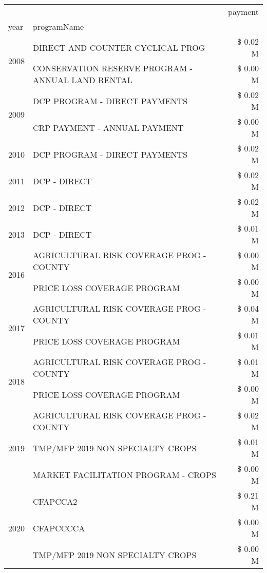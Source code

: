 \begin{tabular}{llr}
\toprule
 &  & payment \\
year & programName &  \\
\midrule
\multirow[t]{2}{*}{2008} & DIRECT AND COUNTER CYCLICAL PROG & \$ 0.02 M \\
 & CONSERVATION RESERVE PROGRAM - ANNUAL LAND RENTAL & \$ 0.00 M \\
\cline{1-3}
\multirow[t]{2}{*}{2009} & DCP PROGRAM - DIRECT PAYMENTS & \$ 0.02 M \\
 & CRP PAYMENT - ANNUAL PAYMENT & \$ 0.00 M \\
\cline{1-3}
2010 & DCP PROGRAM - DIRECT PAYMENTS & \$ 0.02 M \\
\cline{1-3}
2011 & DCP - DIRECT & \$ 0.02 M \\
\cline{1-3}
2012 & DCP - DIRECT & \$ 0.02 M \\
\cline{1-3}
2013 & DCP - DIRECT & \$ 0.01 M \\
\cline{1-3}
\multirow[t]{2}{*}{2016} & AGRICULTURAL RISK COVERAGE PROG - COUNTY & \$ 0.00 M \\
 & PRICE LOSS COVERAGE PROGRAM & \$ 0.00 M \\
\cline{1-3}
\multirow[t]{2}{*}{2017} & AGRICULTURAL RISK COVERAGE PROG - COUNTY & \$ 0.04 M \\
 & PRICE LOSS COVERAGE PROGRAM & \$ 0.01 M \\
\cline{1-3}
\multirow[t]{2}{*}{2018} & AGRICULTURAL RISK COVERAGE PROG - COUNTY & \$ 0.01 M \\
 & PRICE LOSS COVERAGE PROGRAM & \$ 0.00 M \\
\cline{1-3}
\multirow[t]{3}{*}{2019} & AGRICULTURAL RISK COVERAGE PROG - COUNTY & \$ 0.02 M \\
 & TMP/MFP 2019 NON SPECIALTY CROPS & \$ 0.01 M \\
 & MARKET FACILITATION PROGRAM - CROPS & \$ 0.00 M \\
\cline{1-3}
\multirow[t]{3}{*}{2020} & CFAPCCA2 & \$ 0.21 M \\
 & CFAPCCCCA & \$ 0.00 M \\
 & TMP/MFP 2019 NON SPECIALTY CROPS & \$ 0.00 M \\
\cline{1-3}
\bottomrule
\end{tabular}
